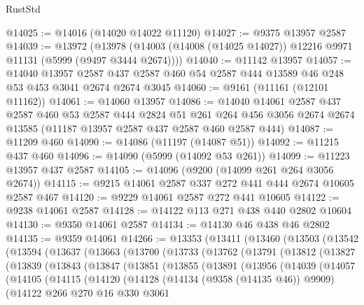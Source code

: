 \begin{lexlean}{RustStd}
\begin{coremodule}
@14025 := @14016 (@14020 @14022 @11120)
@14027 := @9375 @13957 @2587
@14039 := @13972
    (@13978 (@14003 (@14008 (@14025 @14027)) @12216 @9971 @11131 (@5999 (@9497 @3444 @2674))))
@14040 := @11142 @13957
@14057 := @14040
    @13957
    @2587
    @437
    @2587
    @460
    @54
    @2587
    @444
    @13589
    @46
    @248
    @53
    @453
    @3041
    @2674
    @2674
    @3045
@14060 := @9161 (@11161 (@12101 @11162))
@14061 := @14060 @13957
@14086 := @14040
    @14061
    @2587
    @437
    @2587
    @460
    @53
    @2587
    @444
    @2824
    @51
    @261
    @264
    @456
    @3056
    @2674
    @2674
    @13585
    (@11187 @13957 @2587 @437 @2587 @460 @2587 @444)
@14087 := @11209 @460
@14090 := @14086 (@11197 (@14087 @51))
@14092 := @11215 @437 @460
@14096 := @14090 (@5999 (@14092 @53 @261))
@14099 := @11223 @13957 @437 @2587
@14105 := @14096 (@9200 (@14099 @261 @264 @3056 @2674))
@14115 := @9215 @14061 @2587 @337 @272 @441 @444 @2674 @10605 @2587 @467
@14120 := @9229 @14061 @2587 @272 @441 @10605
@14122 := @9238 @14061 @2587
@14128 := @14122 @113 @271 @438 @440 @2802 @10604
@14130 := @9350 @14061 @2587
@14134 := @14130 @46 @438 @46 @2802
@14135 := @9359 @14061
@14266 := @13353
    (@13411
      (@13460
        (@13503
          (@13542
            (@13594
              (@13637
                (@13663
                  (@13700
                    (@13733
                      (@13762
                        (@13791
                          (@13812
                            (@13827
                              (@13839
                                (@13843
                                  (@13847
                                    (@13851
                                      (@13855
                                        (@13891
                                          (@13956
                                            (@14039
                                              (@14057
                                                (@14105
                                                  (@14115
                                                    (@14120
                                                      (@14128
                                                        (@14134 (@9358 (@14135 @46)) @9909)
                                                        (@14122
                                                          @266
                                                          @270
                                                          @16
                                                          @330
                                                          @3061

\end{coremodule}
\end{lexlean}
